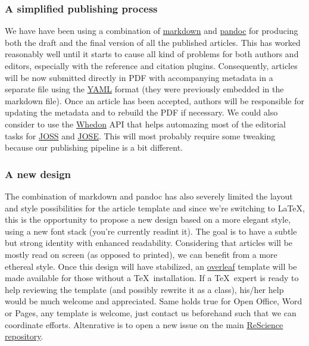 \subsubsection{A simplified publishing process}

We have have been using a combination of
\href{https://daringfireball.net/projects/markdown/syntax}{markdown} and
\href{http://pandoc.org/}{pandoc} for producing both the draft and the final
version of all the published articles. This has worked reasonably well until it
starts to cause all kind of problems for both authors and editors, especially
with the reference and citation plugins. Consequently, articles will be now
submitted directly in PDF with accompanying metadata in a separate file using
the \href{https://en.wikipedia.org/wiki/YAML}{YAML} format (they were
previously embedded in the markdown file). Once an article has been accepted,
authors will be responsible for updating the metadata and to rebuild the PDF if
necessary. We could also consider to use the
\href{https://github.com/openjournals/whedon}{Whedon} API that helps automazing
most of the editorial tasks for \href{http://joss.theoj.org/}{JOSS} and
\href{http://jose.theoj.org/}{JOSE}. This will most probably require some
tweaking because our publishing pipeline is a bit different.


\subsubsection{A new design}

The combination of markdown and pandoc has also severely limited the layout and
style possibilities for the article template and since we're switching to
\LaTeX, this is the opportunity to propose a new design based on a more elegant
style, using a new font stack\supercite{SourceSerifPro:2014, Roboto:2011,
  SourceCodePro:2012} (you're currently readint it). The goal is to have a
subtle but strong identity with enhanced readability. Considering that articles
will be mostly read on screen (as opposed to printed), we can benefit from a
more ethereal style. Once this design will have stabilized, an
\href{https://www.overleaf.com/}{overleaf} template will be made available for
those without a \TeX~installation. If a \TeX~expert is ready to help reviewing
the template (and possibly rewrite it as a class), his/her help would be much
welcome and appreciated. Same holds true for Open Office, Word or Pages, any
template is welcome, just contact us beforehand such that we can coordinate
efforts. Altenrative is to open a new issue on the
main \href{https://github.com/ReScience/ReScience}{ReScience repository}.


